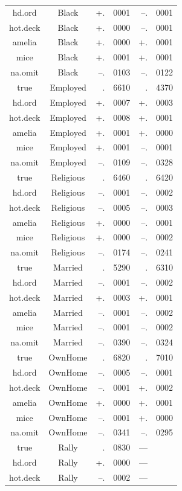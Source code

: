 \documentclass[12pt,econ]{sources/authesis}
\begin{document}
\begin{longtable}{ccr@{}lr@{}l}
 hd.ord & Black & +.&0001 & --.&0001 \\
 hot.deck & Black & +.&0000 & --.&0001 \\
 amelia & Black & +.&0000 & +.&0001 \\ 
 mice & Black & +.&0001 & +.&0001 \\ 
 na.omit & Black & --.&0103 & --.&0122 \\ 
 true & Employed & .&6610 & .&4370 \\
 hd.ord & Employed & +.&0007 & +.&0003 \\
 hot.deck & Employed & +.&0008 & +.&0001 \\ 
 amelia & Employed & +.&0001 & +.&0000 \\
 mice & Employed & +.&0001 & --.&0001 \\
 na.omit & Employed & --.&0109 & --.&0328 \\
 true & Religious & .&6460 & .&6420 \\ 
 hd.ord & Religious & --.&0001 & --.&0002 \\ 
 hot.deck & Religious & --.&0005 & --.&0003 \\ 
 amelia & Religious & +.&0000 & --.&0001 \\
 mice & Religious & +.&0000 & --.&0002 \\
 na.omit & Religious & --.&0174 & --.&0241 \\ 
 true & Married & .&5290 & .&6310 \\ 
 hd.ord & Married & --.&0001 & --.&0002 \\ 
 hot.deck & Married & +.&0003 & +.&0001 \\ 
 amelia & Married & --.&0001 & --.&0002 \\ 
 mice & Married & --.&0001 & --.&0002 \\ 
 na.omit & Married & --.&0390 & --.&0324 \\ 
 true & OwnHome & .&6820 & .&7010 \\ 
 hd.ord & OwnHome & --.&0005 & --.&0001 \\
 hot.deck & OwnHome & --.&0001 & +.&0002 \\ 
 amelia & OwnHome & +.&0000 & +.&0001 \\
 mice & OwnHome & --.&0001 & +.&0000 \\
 na.omit & OwnHome & --.&0341 & --.&0295 \\
 true & Rally & .&0830 & --- \\ 
 hd.ord & Rally & +.&0000 & --- \\ 
 hot.deck & Rally & --.&0002 & --- \\

\end{longtable}
\end{document}
